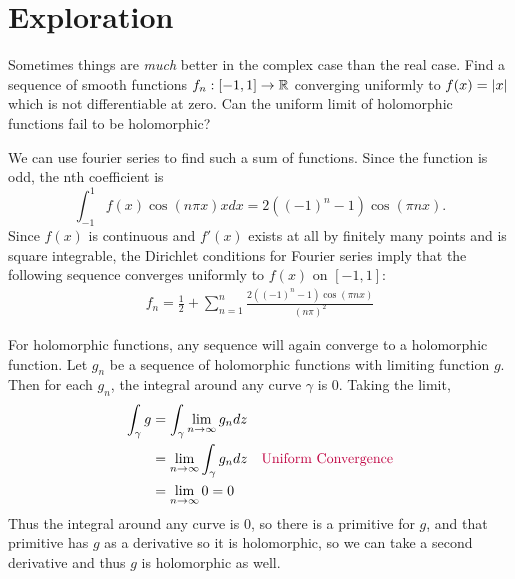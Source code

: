 \documentclass{homework}
\begin{document}
                              \section{Exploration}

                              \begin{problem}\label{uniform_limit_is_holomorphic}
                                Sometimes things are \textit{much} better in the complex case than
                                  the real case.  Find a sequence of smooth functions
                                    $f_n : [-1,1] \to \mathbb{R}$ converging uniformly to $f(x) = \left|x\right|$ which
                                      is not differentiable at zero.  Can the uniform limit of holomorphic
                                        functions fail to be holomorphic?
                                        \end{problem}
                                        \begin{solution}
                                        We can use fourier series to find such a sum of functions. Since the function is odd, the nth coefficient is 
                                        \[\int_{-1}^1 f(x)\cos(n\pi x)x dx = 2((-1)^n-1)\cos(\pi nx).\] Since $f(x)$ is continuous and $f'(x)$ exists at all by finitely many points and is square integrable, the Dirichlet conditions for Fourier series imply that the following sequence converges uniformly to $f(x)$ on $[-1, 1]$:
                                        \begin{align*}
                                            f_n = \frac{1}{2} + \sum_{n=1}^n \frac{2((-1)^n-1)\cos(\pi nx)}{(n\pi)^2}
                                            \end{align*}

                                            For holomorphic functions, any sequence will again converge to a holomorphic function. Let $g_n$ be a sequence of holomorphic functions with limiting function $g$. Then for each $g_n$, the integral around any curve $\gamma$ is 0. Taking the limit, 
                                            \begin{align*}
                                                \int_\gamma g &= \int_\gamma \lim_{n\to\infty} g_n dz\\
                                                    &= \lim_{n\to\infty}\int_\gamma  g_n dz \quad \color{purple} \text{Uniform Convergence}\\
                                                        &= \lim_{n\to\infty} 0 = 0
                                                        \end{align*}
                                                        Thus the integral around any curve is 0, so there is a primitive for $g$, and that primitive has $g$ as a derivative so it is holomorphic, so we can take a second derivative and thus $g$ is holomorphic as well.
                                                        \end{solution}
\end{document}
